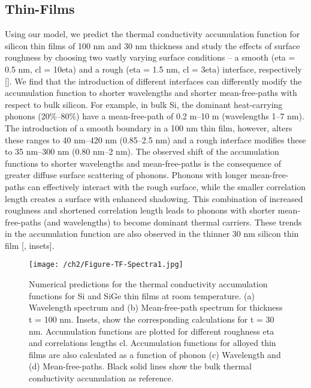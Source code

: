 \subsection{Thin-Films}
Using our model, we predict the thermal conductivity accumulation function for silicon thin films of 100 nm and 30 nm thickness and study the effects of surface roughness by choosing two vastly varying surface conditions -- a smooth (\gls{eta} = 0.5 nm, \gls{cl} = 10\gls{eta}) and a rough (\gls{eta} = 1.5 nm, \gls{cl} = 3\gls{eta}) interface, respectively []. We find that the introduction of different interfaces can differently modify the accumulation function to shorter wavelengths and shorter mean-free-paths with respect to bulk silicon. For example, in bulk Si, the dominant heat-carrying phonons (20\%–80\%) have a mean-free-path of 0.2 \si{\micro}m–10 \si{\micro}m (wavelengths 1–7 nm). The introduction of a smooth boundary in a 100 nm thin film, however, alters these ranges to 40 nm–420 nm (0.85–2.5 nm) and a rough interface modifies these to 35 nm–300 nm (0.80 nm–2 nm). The observed shift of the accumulation functions to shorter wavelengths and mean-free-paths is the consequence of greater diffuse surface scattering of phonons. Phonons with longer mean-free-paths can effectively interact with the rough surface, while the smaller correlation length creates a surface with enhanced shadowing. This combination of increased roughness and shortened correlation length leads to phonons with shorter mean-free-paths (and wavelengths) to become dominant thermal carriers. These trends in the accumulation function are also observed in the thinner 30 nm silicon thin film [, insets].
\begin{figure}[hbt]
  \centering \texttt{[image: /ch2/Figure-TF-Spectra1.jpg]}
  \caption{Numerical predictions for the thermal conductivity accumulation functions for Si and SiGe thin films at room temperature. (a) Wavelength spectrum and (b) Mean-free-path spectrum for thickness \gls{t} = 100 nm. Insets, show the corresponding calculations for \gls{t} = 30 nm. Accumulation functions are plotted for different roughness \gls{eta} and correlations lengths \gls{cl}. Accumulation functions for  alloyed thin films are also calculated as a function of phonon (c) Wavelength and (d) Mean-free-paths. Black solid lines show the bulk thermal conductivity accumulation as reference.}
  \label{fig:ch2-tf-spectra-1}
\end{figure}
